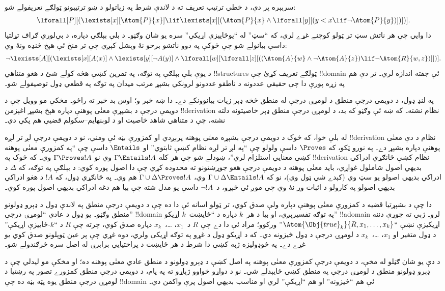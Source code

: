 \documentclass[../../../include/open-logic-section]{subfiles}
\begin{document}
سربېره پر دې، د خطي ترتيب تعريف ته د لاندې شرط په زياتولو د ښو
ترتيبونو ټولګے تعريفولے شو:
\[
\lforall[P][(\lexists[x][\Atom{P}{x}] \lif \lexists[x][(\Atom{P}{x}
    \land \lforall[y][(y < x \lif \lnot \Atom{P}{y})])])].
\]
دا وايي چې هر ناتش سټ تر ټولو کوچنے غړے لري، که ``سټ'' له ``يوځاييزې
اړيکې'' سره يو شان وګڼو۔ د بلې بېلګې دپاره، د بې‌لوري ګراف تړلتيا داسې بيانولے شو چې څوکې په دوو ناتشو
برخو نۀ وېشل کېږي چې تر منځ ئې هېڅ څنډه ونۀ وي:
\[
\lnot \lexists[A][(\lexists[x][A(x)] \land \lexists[y][\lnot A(y)]
  \land \lforall[w][\lforall[z][((\Atom{A}{w} \land \lnot \Atom{A}{z})
      \lif \lnot \Atom{R}{w,z})]])].
\]
د يوې بلې بېلګې په توګه، په تمرين کښې هڅه کولے شئ د هغو متناهي
!!{structure}s ټولګے تعريف کړئ چې !!{domain} ئې جفته اندازه لري۔ تر
دې هم په زړه پورې دا چې حقيقي عددونه د ناطقو عددونو لرونکي بشپړ مرتب
ميدان په توګه په قطعي ډول توصيفولے شو۔

په لنډ ډول، د دويمې درجې منطق د لومړۍ درجې له منطق څخه ډېر زيات
بيانوونکے دے۔ دا ښه خبر و؛ اوس بد خبر ته راځو۔ مخکې مو وويل چې د
دويمې درجې د بشپړې معنٰی پوهنې دپاره هېڅ بشپړ اغېزمن !!{derivation}
نظام نشته۔ که ښه ئې وګڼو که بد، د لومړۍ درجې منطق ډېر خاصيتونه دلته
نشته، چې د متناهي شاهد خاصيت او د لوېنهايم--سکولم قضيې هم پکې دي۔

له بلې خوا، که څوک د دويمې درجې بشپړه معنٰی پوهنه پرېږدي او کمزورې
بڼه ئې ومني، نو د دويمې درجې لږ تر لږه !!{derivation} نظام د دې معنٰی
پوهنې دپاره بشپړ دے۔ په نورو ټکو، که $\Proves$ داسې ولولو چې ``په لږ
تر لږه نظام کښې ثابتوي'' او $\Entails$ داسې چې ``په کمزورې معنٰی پوهنه
کښې معنايي استلزام لري''، ښودلے شو چې هر کله $\Gamma \Entails !A$ وي
نو $\Gamma \Proves !A$ وي۔ که څوک په !!{derivation} نظام کښې ځانګړي
ادراکي بديهي اصول شاملول غواړي، بايد معنٰی پوهنه د دويمې درجې هغو
جوړښتونو ته محدوده کړي چې دا اصول پوره کوي: د بېلګې په توګه، که
$\Delta$ د ادراکي بديهي اصولو يو سټ وي (کېدے شي ټول وي)، نو که
$\Gamma \cup \Delta \Entails !A$ وي، $\Gamma \cup \Delta \Proves !A$
هم وي۔ په ځانګړي ډول، که $!A$ د هغو ادراکي بديهي اصولو په کارولو د
اثبات وړ نۀ وي چې موږ ئې څېړو، د~$\lnot !A$ داسې يو مدل شته چې بيا هم
دغه ادراکي بديهي اصول پوره کوي۔

دا چې د بشپړتيا قضيه د کمزورې معنٰی پوهنې دپاره ولې صدق کوي، تر ټولو
اسانه ئې دا ده چې د دويمې درجې منطق په لاندې ډول د ډېرو ډولونو منطق
وګڼو۔ يو ډول د عادي ``لومړۍ درجې'' !!{domain} په توګه تفسيرېږي، او
بيا د هر~$k$ دپاره د ``ځايښت~$k$ اړيکو'' !!a{domain} لرو۔ ژبې ته
جوړې دننه اړيکيزې نښې ``$\Atom{\Obj{true}_k}{R,x_1,\dots,x_k}$''
ورکوو؛ مراد ئې دا دے چې $R$ د~$x_1$، \dots،~$x_k$ دپاره صدق کوي،
چرته چې $R$ د ``$k$-ځاييزې اړيکې'' د ډول متغير او $x_1$،
\dots،~$x_k$ د لومړۍ درجې د ډول څيزونه دي۔ که د اړيکو ډول
د غړو په توګه اړيکې ولري، دوه غړي چې پر عين ټوپلونو صدق کوي يو
غړے دے۔ په څوډوليزه ژبه کښې دا شرط د هر ځايښت د پراختيايي
برابرۍ له اصل سره څرګندولے شو۔

د دې يو شان ګڼلو له مخې، د دويمې درجې کمزورې معنٰی پوهنه په اصل کښې د
ډېرو ډولونو د منطق عادي معنٰی پوهنه ده؛ او مخکې مو ليدلي چې د ډېرو
ډولونو منطق د لومړۍ درجې په منطق کښې ځايېدلے شي۔ نو د دواړو خواوو
ژباړو ته په پام، د دويمې درجې منطق کمزورے تصور په رښتيا د لومړۍ درجې
منطق يوه پټه بڼه ده چې !!{domain} ئې هم ``څيزونه'' او هم ``اړيکې''
لري او مناسب بديهي اصول پرې واکمن دي۔
\end{document}
